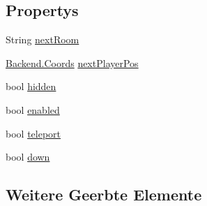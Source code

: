 \subsection*{Propertys}
\begin{DoxyCompactItemize}
\item 
String \hyperlink{class_gruppe22_1_1_backend_1_1_teleport_tile_a133def222075e29e9434e8ffb4e4bf1a}{next\-Room}
\item 
\hyperlink{class_gruppe22_1_1_backend_1_1_coords}{Backend.\-Coords} \hyperlink{class_gruppe22_1_1_backend_1_1_teleport_tile_ab83627306a280afbfadb8441b6df0485}{next\-Player\-Pos}
\item 
bool \hyperlink{class_gruppe22_1_1_backend_1_1_teleport_tile_abee7ec642fbd77e0d6b16105aa42b589}{hidden}
\item 
bool \hyperlink{class_gruppe22_1_1_backend_1_1_teleport_tile_ac83bb7b79fd78d4c91114629c5306cc8}{enabled}
\item 
bool \hyperlink{class_gruppe22_1_1_backend_1_1_teleport_tile_aad5853c299ee66afac5565812cabdf52}{teleport}
\item 
bool \hyperlink{class_gruppe22_1_1_backend_1_1_teleport_tile_a0730a9a54b6e01a66e2db7db4e33de49}{down}
\end{DoxyCompactItemize}
\subsection*{Weitere Geerbte Elemente}


